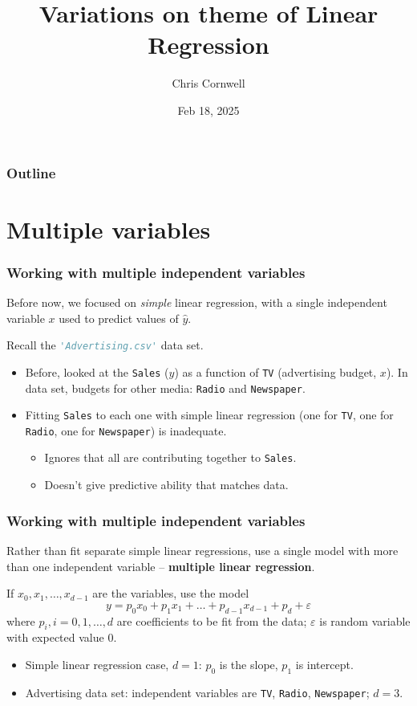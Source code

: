 \documentclass{beamer}
\author{Chris Cornwell}
\date{Feb 18, 2025}
\title{Variations on theme of Linear Regression}
\theoremstyle{example}
\newcommand{\ttt}[1]{{\small\texttt{#1}}}
\begin{document}
\begin{frame}
\titlepage
\end{frame}

\begin{frame}
\frametitle{Outline}
\tableofcontents
\end{frame}

\section{Multiple variables}

\begin{frame}
\frametitle{Working with multiple independent variables}
Before now, we focused on \emph{simple} linear regression, with a single independent variable $x$ used to predict values of $\hat{y}$.

Recall the \lstinline[language=Python, stringstyle=\ttfamily\color{strings}]{'Advertising.csv'} data set.

\pause
\begin{itemize}
    \item Before, looked at the \ttt{Sales} ($y$) as a function of \ttt{TV} (advertising budget, $x$). In data set, budgets for other media: \ttt{Radio} and \ttt{Newspaper}.
    \pause
    \item Fitting \ttt{Sales} to each one with simple linear regression (one for \ttt{TV}, one for \ttt{Radio}, one for \ttt{Newspaper}) is inadequate. 
    \pause
    \begin{itemize}
        \item Ignores that all are contributing together to \ttt{Sales}.
        \item Doesn't give predictive ability that matches data.
    \end{itemize}
\end{itemize}

\end{frame}

\begin{frame}
\frametitle{Working with multiple independent variables}
    Rather than fit separate simple linear regressions, use a single model with more than one independent variable {--} \textbf{multiple linear regression}. 
\pause

    If $x_0,x_1,\ldots,x_{d-1}$ are the variables, use the model 
    \[y = p_0x_0 + p_1x_1 + \ldots + p_{d-1}x_{d-1} + p_d + \varepsilon\]
    where $p_i, i=0,1,\ldots,d$ are coefficients to be fit from the data; $\varepsilon$ is random variable with expected value 0.
    \pause
    \begin{itemize}
        \item Simple linear regression case, $d=1$: $p_0$ is the slope, $p_1$ is intercept.
        \pause
        \item Advertising data set: independent variables are \ttt{TV}, \ttt{Radio}, \ttt{Newspaper}; $d = 3$.
    \end{itemize}
\vfill

\end{frame}
\end{document}
